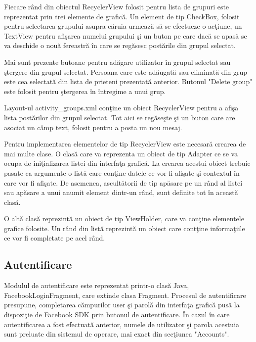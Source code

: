 	Fiecare r\^{a}nd din obiectul RecyclerView folosit pentru lista de grupuri este reprezentat prin trei elemente de grafic\u{a}. Un element de tip CheckBox, folosit pentru selectarea grupului asupra c\u{a}ruia urmeaz\u{a} s\u{a} se efectueze o ac\c{t}iune, un TextView pentru afi\c{s}area numelui grupului \c{s}i un buton pe care dac\u{a} se apas\u{a} se va deschide o nou\u{a} fereastr\u{a} \^{i}n care se reg\u{a}sesc post\u{a}rile din grupul selectat.
	
	 Mai sunt prezente butoane pentru ad\u{a}gare utilizator \^{i}n grupul selectat sau \c{s}tergere din grupul selectat. Persoana care este ad\u{a}ugat\u{a} sau eliminat\u{a} din grup este cea selectat\u{a} din lista de prieteni prezentat\u{a} anterior. Butonul "Delete group" este folosit pentru \c{s}tergerea \^{i}n \^{i}ntregime a unui grup.  
	
Layout-ul activity_groups.xml con\c{t}ine un obiect RecyclerView pentru a afi\c{s}a lista post\u{a}rilor din grupul selectat. Tot aici se reg\u{a}se\c{s}te \c{s}i un buton care are asociat un c\^{a}mp text, folosit pentru a posta un nou mesaj.	
	
	Pentru implementarea elementelor de tip RecyclerView este necesar\u{a} crearea de mai multe clase. O clas\u{a} care va reprezenta un obiect de tip Adapter ce se va ocupa de ini\c{t}ializarea listei din interfa\c{t}a grafic\u{a}. La crearea acestui obiect trebuie pasate ca argumente o list\u{a} care con\c{t}ine datele ce vor fi afi\c{s}ate \c{s}i contextul \^{i}n care vor fi afi\c{s}ate. De asemenea, ascult\u{a}torii de tip ap\u{a}sare pe un r\^{a}nd al listei sau ap\u{a}sare a unui anumit element dintr-un r\^{a}nd, sunt definite tot \^{i}n aceast\u{a} clas\u{a}.
	
	 O alt\u{a} clas\u{a} reprezint\u{a} un obiect de tip ViewHolder, care va con\c{t}ine elementele grafice folosite. Un r\^{a}nd din list\u{a} reprezint\u{a} un obiect care cont\c{t}ine informa\c{t}iile ce vor fi completate pe acel r\^{a}nd. 

\subsection{Autentificare}

Modulul de autentificare este reprezentat printr-o clas\u{a} Java, FacebookLoginFragment, care extinde clasa Fragment. Procesul de autentificare presupune, completarea c\u{a}mpurilor user \c{s}i parol\u{a} din interfa\c{t}a grafic\u{a} pus\u{a} la dispozi\c{t}ie de Facebook SDK prin butonul de autentificare. \^{I}n cazul \^{i}n care autentificarea a fost efectuat\u{a} anterior, numele de utilizator \c{s}i parola acestuia sunt preluate din sistemul de operare, mai exact din sec\c{t}iunea "Accounts".

